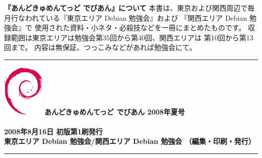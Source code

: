 \documentclass[mingoth,a4paper]{jsarticle}
\begin{document}
\printindex

\cleartooddpage

{
\large
\begin{itembox}{\bf 『あんどきゅめんてっど でびあん』について}
本書は、東京および関西周辺で毎月行なわれている『東京エリア Debian 勉強会』および
『関西エリア Debian 勉強会』で
使用された資料・小ネタ・必殺技などを一冊にまとめたものです。
収録範囲は東京エリアは勉強会第35回から第40回、関西エリアは
第10回から第13回まで。
内容は無保証、つっこみなどがあれば勉強会にて。
\end{itembox}
}

\vspace*{15cm}
{\color{dancerlightblue}\rule{\hsize}{1mm}}
\vspace{2mm}
\includegraphics[width=2cm]{image200502/openlogo-nd.eps}
\noindent \Large \bf あんどきゅめんてっど でびあん 2008年夏号\\ \\
\noindent \normalfont 2008年8月16日 \hspace{5mm}  初版第1刷発行\\
\noindent \normalfont 東京エリア Debian 勉強会/関西エリア Debian 勉強会 （編集・印刷・発行）\\
{\color{dancerdarkblue}\rule{\hsize}{1mm}}
\end{document}
